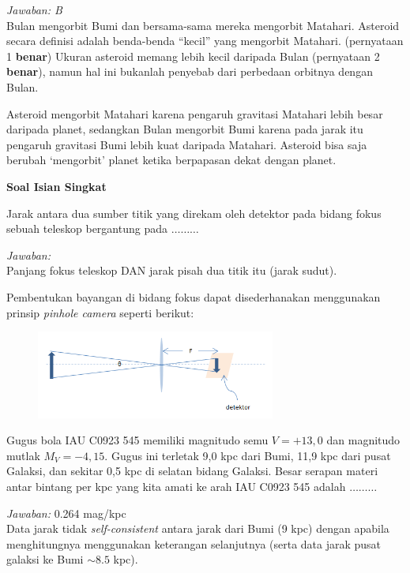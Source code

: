 \documentclass[11pt,fleqn, a4paper]{exam}
\begin{document}
\begin{questions}
\textit{Jawaban: B}\\
Bulan mengorbit Bumi dan bersama-sama mereka mengorbit Matahari. Asteroid secara definisi adalah benda-benda ``kecil'' yang mengorbit Matahari. (pernyataan 1 \textbf{benar})
Ukuran asteroid memang lebih kecil daripada Bulan (pernyataan 2 \textbf{benar}), namun hal ini bukanlah penyebab dari perbedaan orbitnya dengan Bulan. 

Asteroid mengorbit Matahari karena pengaruh gravitasi Matahari lebih besar daripada planet, sedangkan Bulan mengorbit Bumi karena pada jarak itu pengaruh gravitasi Bumi lebih kuat daripada Matahari. Asteroid bisa saja berubah `mengorbit' planet ketika berpapasan dekat dengan planet.

\vspace{1cm}
\textbf{Soal Isian Singkat}

\vspace{0.5cm} 
\question Jarak antara dua sumber titik yang direkam oleh detektor pada bidang fokus sebuah teleskop bergantung pada $\ldots\ldots\ldots$

\textit{Jawaban: }\\
Panjang fokus teleskop DAN jarak pisah dua titik itu (jarak sudut). 

Pembentukan bayangan di bidang fokus dapat disederhanakan menggunakan prinsip \textit{pinhole camera} seperti berikut:
\begin{figure}[H]
\centering
\includegraphics[width=0.7\textwidth]{gambar/16.png}
\end{figure}


\vspace{0.5cm}
\question Gugus bola IAU C0923 545 memiliki magnitudo semu $V = +13,0$ dan magnitudo mutlak $M_V = -4,15$. Gugus ini terletak 9,0 kpc dari Bumi, 11,9 kpc dari pusat Galaksi, dan sekitar 0,5 kpc di selatan bidang Galaksi. Besar serapan materi antar bintang per kpc yang kita amati ke arah IAU C0923 545 adalah $\ldots\ldots\ldots$

\textit{Jawaban: } 0.264 mag/kpc\\
Data jarak tidak \textit{self-consistent} antara jarak dari Bumi (9 kpc) dengan apabila menghitungnya menggunakan keterangan selanjutnya (serta data jarak pusat galaksi ke Bumi $\sim 8.5$ kpc).


\end{questions}
\end{document}
